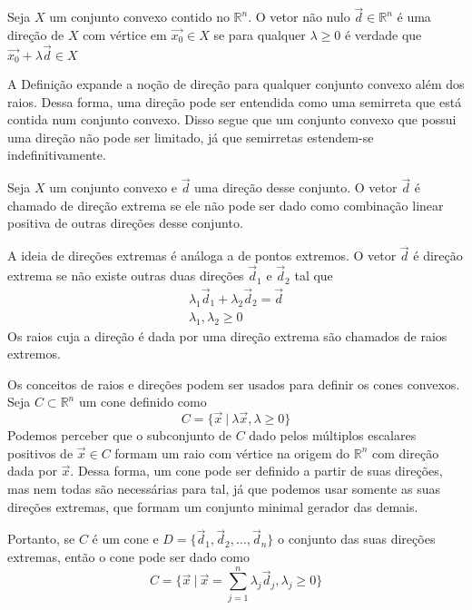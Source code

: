 \begin{def:direção}
	Seja $X$ um conjunto convexo contido no $\mathbb{R}^n$. O vetor não nulo $\vec{d} \in \mathbb{R}^n$ é uma direção de $X$ com vértice em $\vec{x_0} \in X$ se para qualquer $\lambda \geq 0$ é verdade que $\vec{x_0} + \lambda \vec{d} \in X$  
\end{def:direção}

A Definição expande a noção de direção para qualquer conjunto convexo além dos raios. Dessa forma, uma direção pode ser entendida como uma semirreta que está contida num conjunto convexo. Disso segue que um conjunto convexo que possui uma direção não pode ser limitado, já que semirretas estendem-se indefinitivamente.

\begin{def:direção extrema}
	Seja $X$ um conjunto convexo e $\vec{d}$ uma direção desse conjunto. O vetor $\vec{d}$ é chamado de direção extrema se ele não pode ser dado como combinação linear positiva de outras direções desse conjunto.
\end{def:direção extrema}

A ideia de direções extremas é análoga a de pontos extremos. O vetor $\vec{d}$ é direção extrema se não existe outras duas direções $\vec{d}_1$ e $\vec{d}_2$ tal que
\begin{gather*}
	\lambda_1\vec{d}_1 + \lambda_2\vec{d}_2 = \vec{d} \\
	\lambda_1, \lambda_2 \geq 0
\end{gather*}
Os raios cuja a direção é dada por uma direção extrema são chamados de raios extremos.

Os conceitos de raios e direções podem ser usados para definir os cones convexos. Seja $C \subset \mathbb{R}^n$ um cone definido como \[C = \{\vec{x}\ |\ \lambda\vec{x}, \lambda \geq 0\}\]Podemos perceber que o subconjunto de $C$ dado pelos múltiplos escalares positivos de $\vec{x} \in C$ formam um raio com vértice na origem do $\mathbb{R}^n$ com direção dada por $\vec{x}$. Dessa forma, um cone pode ser definido a partir de suas direções, mas nem todas são necessárias para tal, já que podemos usar somente as suas direções extremas, que formam um conjunto minimal gerador das demais.

Portanto, se $C$ é um cone e $D = \{\vec{d}_1, \vec{d}_2, \ldots, \vec{d}_n\}$ o conjunto das suas direções extremas, então o cone pode ser dado como
\begin{equation*}
	C = \{\vec{x}\ |\ \vec{x} = \displaystyle\sum_{j = 1}^{n}
			\lambda_j \vec{d}_j, \lambda_j \geq 0\}
\end{equation*}

